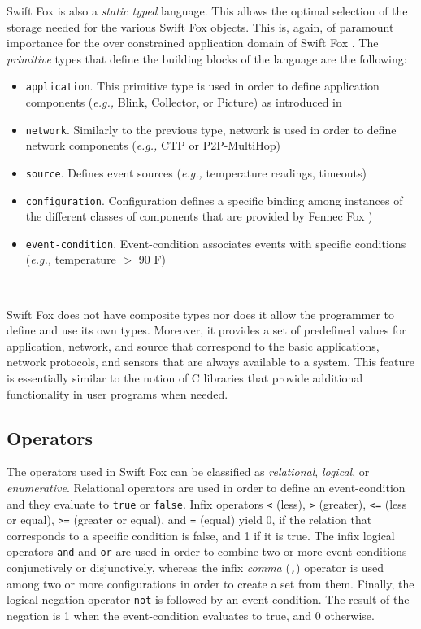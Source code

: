 \documentclass[11pt]{article}
\begin{document}
Swift Fox is also a \textit{static typed} language. This allows the optimal
selection of the storage needed for the various Swift Fox objects. This is,
again, of paramount importance for the over constrained application domain
of Swift Fox \cite{marcin:whitepaper}. The \textit{primitive} types that
define the building blocks of the language are the following:

\begin{itemize}
	\item \texttt{application}. This primitive type is used in order to
	define application components (\textit{e.g.,} Blink, Collector, or
	Picture) as introduced in \cite{marcin:tutorial}
	\item \texttt{network}. Similarly to the previous type, network
	is used in order to define network components (\textit{e.g.,}
	CTP or P2P-MultiHop)
	\item \texttt{source}. Defines event sources (\textit{e.g.,}
	temperature readings, timeouts)
	\item \texttt{configuration}. Configuration defines a specific
	binding among instances of the different classes of components
	that are provided by Fennec Fox \cite{marcin:tutorial})
	\item \texttt{event-condition}. Event-condition associates events
	with specific conditions (\textit{e.g.,} temperature $>$ 90 F)
\end{itemize}

\

\hangindent=4cm
\small
\noindent
Swift Fox does not have composite types nor does it allow the programmer to
define and use its own types. Moreover, it provides a set of predefined
values for application, network, and source that correspond to the basic
applications, network protocols, and sensors that are always available to a
system. This feature is essentially similar to the notion of C libraries
that provide additional functionality in user programs when needed.
\normalsize

\subsection{Operators}

The operators used in Swift Fox can be classified as \textit{relational},
\textit{logical}, or \textit{enumerative}. Relational operators are used
in order to define an event-condition and they evaluate to \texttt{true}
or \texttt{false}. Infix operators \texttt{<} (less), \texttt{>} (greater),
\texttt{<=} (less or equal), \texttt{>=} (greater or equal), and
\texttt{=} (equal) yield 0, if the relation that corresponds to a specific
condition is false, and 1 if it is true. The infix logical operators
\texttt{and} and \texttt{or} are used in order to combine two or more
event-conditions conjunctively or disjunctively, whereas the infix
\textit{comma} (\texttt{,}) operator is used among two or more
configurations in order to create a set from them. Finally, the logical
negation operator \texttt{not} is followed by an event-condition. The
result of the negation is 1 when the event-condition evaluates to true, and
0 otherwise.
\end{document}
